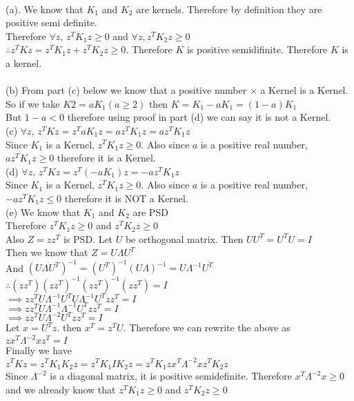 \begin{answer}\\
(a). We know that $K_1$ and $K_2$ are kernels. Therefore by definition they are positive semi definite.\\
Therefore $\forall z$, $z^TK_1z \geq 0$ and $\forall z, z^TK_2z \geq 0$\\
$\therefore z^TKz = z^TK_1z+z^TK_2z \geq 0$. Therefore $K$ is positive semidifinite. Therefore $K$ is a kernel.\\
\\
(b) From part (c) below we know that a positive number $\times$ a Kernel is a Kernel. So if we take $K2=aK_1 (a \geq 2)$ then $K=K_1-aK_1=(1-a)K_1$\\
But $1-a <0$ therefore using proof in part (d) we can say it is not a Kernel.\\
(c) $\forall z$, $z^TKz=z^TaK_1z=az^TK_1z=az^TK_1z$\\
Since $K_1$ is a Kernel, $z^TK_1z \geq 0$. Also since $a$ is a positive real number, $az^TK_1z \geq 0$ therefore it is a Kernel.\\
(d) $\forall z$, $z^TKz=z^T(-aK_1)z=-az^TK_1z$\\
Since $K_1$ is a Kernel, $z^TK_1z \geq 0$. Also since $a$ is a positive real number, $-az^TK_1z \leq 0$ therefore it is NOT a Kernel.\\
(e) We know that $K_1$ and $K_2$ are PSD\\
Therefore $z^TK_1z \geq 0$ and $z^TK_2z \geq 0$\\
Also $Z=zz^T$ is PSD. Let $U$ be orthogonal matrix. Then $UU^T=U^TU=I$\\
Then we know that $Z=U\Lambda U^T$\\
And $(U\Lambda U^T)^{-1}=(U^T)^{-1}(U \Lambda)^{-1}=U \Lambda^{-1} U^T$\\
$\therefore (zz^T)(zz^T)^{-1}(zz^T)^{-1}(zz^T)=I$\\
$\implies zz^T U \Lambda^{-1} U^T U \Lambda^{-1} U^T zz^T=I$\\
$\implies zz^T U \Lambda^{-1} \Lambda^{-1} U^T zz^T=I$\\
$\implies zz^T U \Lambda^{-2} U^T zz^T=I$\\
Let $x=U^Tz$. then $x^T=z^TU$. Therefore we can rewrite the above as\\
$z x^T \Lambda^{-2} x z^T=I$\\
Finally we have \\
$z^TKz=z^TK_1K_2z=z^TK_1IK_2z=z^TK_1 z x^T \Lambda^{-2} x z^TK_2z$\\
Since $\Lambda^{-2}$ is a diagonal matrix, it is positive semidefinite. Therefore $x^T \Lambda^{-2} x \geq 0$ and we already know that $z^TK_1 z \geq 0$ and $z^TK_2 z \geq 0$\\

\end{answer}
